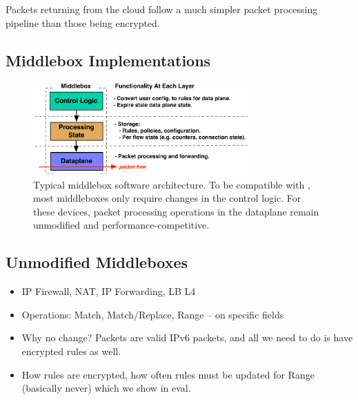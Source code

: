  Packets returning from the cloud follow a much simpler packet processing pipeline than those being encrypted.



\subsection{Middlebox Implementations}
\label{sec:middleboxes}

\begin{figure}[t]
  \includegraphics[width=3.25in]{fig/mbarch}
  \caption[]{Typical middlebox software architecture. To be compatible with \sys, most middleboxes only require changes in the control logic. For these devices, packet processing operations in the dataplane remain unmodified and performance-competitive.}
\end{figure}

\subsection{Unmodified Middleboxes}
\begin{itemize}
  \item IP Firewall, NAT, IP Forwarding, LB L4
  \item Operations: Match, Match/Replace, Range -- on specific fields
  \item Why no change? Packets are valid IPv6 packets, and all we need to do is have encrypted rules as well.
  \item How rules are encrypted, how often rules must be updated for Range (basically never) which we show in eval.
\end{itemize}

